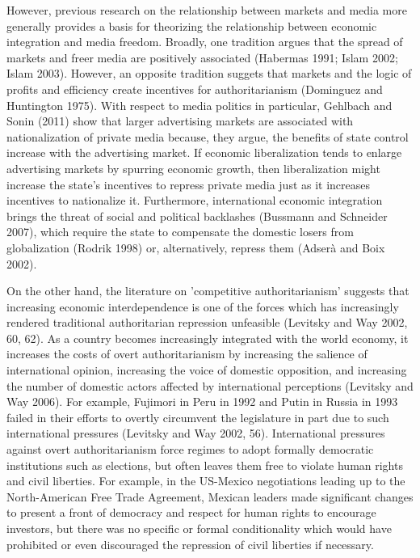 \documentclass[a4paper]{article}\usepackage[]{graphicx}\usepackage[]{color}
\begin{document}
However, previous research on the relationship between markets and media more generally provides a basis for theorizing the relationship between economic integration and media freedom. Broadly, one tradition argues that the spread of markets and freer media are positively associated (Habermas 1991; Islam 2002; Islam 2003). However, an opposite tradition suggets that markets and the logic of profits and efficiency create incentives for authoritarianism (Dominguez and Huntington 1975). With respect to media politics in particular, Gehlbach and Sonin (2011) show that larger advertising markets are associated with nationalization of private media because, they argue, the benefits of state control increase with the advertising market. If economic liberalization tends to enlarge advertising markets by spurring economic growth, then liberalization might increase the state's incentives to repress private media just as it increases incentives to nationalize it. Furthermore, international economic integration brings the threat of social and political backlashes (Bussmann and Schneider 2007), which require the state to compensate the domestic losers from globalization (Rodrik 1998) or, alternatively, repress them (Adserà and Boix 2002).

On the other hand, the literature on 'competitive authoritarianism' suggests that increasing economic interdependence is one of the forces which has increasingly rendered traditional authoritarian repression unfeasible (Levitsky and Way 2002, 60, 62). As a country becomes increasingly integrated with the world economy, it increases the costs of overt authoritarianism by increasing the salience of international opinion, increasing the voice of domestic opposition, and increasing the number of domestic actors affected by international perceptions (Levitsky and Way 2006). For example, Fujimori in Peru in 1992 and Putin in Russia in 1993 failed in their efforts to overtly circumvent the legislature in part due to such international pressures (Levitsky and Way 2002, 56). International pressures against overt authoritarianism force regimes to adopt formally democratic institutions such as elections, but often leaves them free to violate human rights and civil liberties. For example, in the US-Mexico negotiations leading up to the North-American Free Trade Agreement, Mexican leaders made significant changes to present a front of democracy and respect for human rights to encourage investors, but there was no specific or formal conditionality which would have prohibited or even discouraged the repression of civil liberties if necessary.
\end{document}
